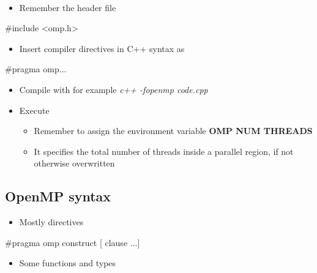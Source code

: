 \documentclass[%
oneside,                 %
final,                   %
10pt]{article}
\begin{document}
\paragraph{}
\begin{itemize}
 \item Remember the header file 
\end{itemize}

\noindent


\bcppcod
#include <omp.h>

\ecppcod

\begin{itemize}
 \item Insert compiler directives in C++ syntax as 
\end{itemize}

\noindent


\bcppcod
#pragma omp...

\ecppcod

\begin{itemize}
\item Compile with for example \emph{c++ -fopenmp code.cpp}

\item Execute
\begin{itemize}

  \item Remember to assign the environment variable \textbf{OMP NUM THREADS}

  \item It specifies the total number of threads inside a parallel region, if not otherwise overwritten
\end{itemize}

\noindent
\end{itemize}

\noindent



\subsection{OpenMP syntax}
\begin{itemize}
\item Mostly directives
\end{itemize}

\noindent


\bcppcod
#pragma omp construct [ clause ...]

\ecppcod

\begin{itemize}
 \item Some functions and types 
\end{itemize}
\end{document}
